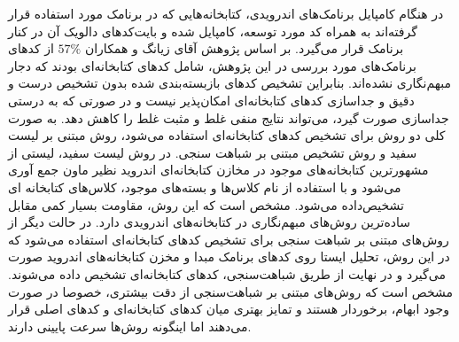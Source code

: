 در هنگام کامپایل برنامک‌های اندرویدی، کتابخانه‌هایی که در برنامک مورد استفاده قرار گرفته‌اند به همراه کد مورد توسعه، کامپایل شده و‌ بایت‌کد‌های دالویک آن در کنار برنامک قرار می‌گیرد. بر اساس پژوهش آقای زیانگ و همکاران 
$57\%$
از کد‌های برنامک‌های مورد بررسی در این پژوهش، شامل کد‌های کتابخانه‌ای بودند که دجار مبهم‌نگاری نشده‌اند. بنابراین تشخیص کد‌های بازبسته‌بندی شده بدون تشخیص درست و دقیق و جداسازی کد‌های کتابخانه‌ای امکان‌پذیر نیست و در صورتی که به درستی جداسازی صورت گیرد، می‌تواند نتایج منفی غلط و مثبت غلط را کاهش دهد. به صورت کلی دو روش برای تشخیص کد‌های کتابخانه‌ای استفاده می‌شود، روش‌ مبتنی بر لیست سفید و روش تشخیص مبتنی بر شباهت سنجی. در روش لیست سفید، لیستی از مشهورترین کتابخانه‌های موجود در مخازن کتابخانه‌ای اندروید نظیر ماون جمع آوری می‌شود و با استفاده از نام‌ کلاس‌ها و بسته‌های موجود، کلاس‌های کتابخانه ای تشخیص‌داده می‌شود. مشخص است که این روش، مقاومت بسیار کمی مقابل ساده‌ترین روش‌های مبهم‌نگاری در کتابخانه‌های اندرویدی دارد. در حالت دیگر از روش‌های مبتنی بر شباهت سنجی برای تشخیص کد‌های کتابخانه‌ای استفاده می‌شود که در این روش، تحلیل ایستا روی کد‌های برنامک‌ مبدا و مخزن کتابخانه‌های اندروید صورت می‌گیرد و در نهایت از طریق شباهت‌سنجی، کد‌های کتابخانه‌ای تشخیص داده می‌شوند. مشخص است که روش‌های مبتنی بر شباهت‌سنجی از دقت بیشتری، خصوصا در صورت وجود ابهام، برخوردار هستند و تمایز بهتری میان کد‌های کتابخانه‌ای و کد‌های اصلی قرار می‌دهند اما اینگونه روش‌ها سرعت پایینی دارند.

